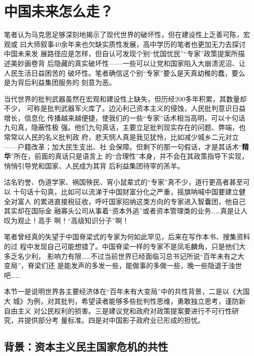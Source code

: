 \chapter{中国未来怎么走？}


笔者认为马克思足够深刻地揭示了现代世界的破坏性，但在建设性上乏善可陈，宏观或
曰大师叙事40余年来也欠缺实质性发展，高中学历的笔者也更加无力去探讨中国未来发
展路径应是怎样，但自认可发现个别“忧国忧民”“专家”政策提案所描述美妙画卷背
后隐藏的真实破坏性——一些可以让党和国家陷入大崩溃泥沼、让人民生活日益困苦的
破坏性。笔者确信这个别“专家”要么是天真幼稚的蠢，要么是为背后利益集团服务的
刻意为恶。

当代世界的批判武器虽然在宏观和建设性上缺失，但历经200多年积累，其数量却不少，
可称是批判武器军火库了。边沁利己资本主义的侵蚀，人民批判意识日益增长，信息化
传播越来越便捷，使我们的一些“专家”话术相当高明，可以十句话九句真，隐蔽性极
强。他们九句真话，主要立足批判现实存在的问题、弊端，也常常以人民的名义批判政
府，悲天悯人真是我见犹怜，比如减少城乡二元对立——户籍改革；加大民生支出、社
会保障。但剩下的那一句假话，才是其话术“\textbf{精华}”所在，前面的真话只是语言上
的“合理性”本身，并不会在其政策指导下实现，悄悄引导党和国家、人民成为其背
后利益集团待宰的羔羊。

沽名钓誉、伪道学家、祸国殃民、宵小鼠辈式的“专家”真不少，道行更高者甚至可以
十句话十句真，比如可以流涕于中国财富分化之严重，摇旗呐喊中国要建立健全对富人
的累进直接税征收，呼吁国家招纳这类方向的专家进入智囊团，他自己其实却在国际金
融寡头公司从事着“资本外逃”或者资本管理类的业务……真是让人叹为观止！高手
啊！“高级知识分子”啊！

笔者曾经真的失望于中国脊梁式的专家为何如此罕见，后来在写作本书、搜集资料的过
程中发现自己可能想错了。中国脊梁一样的专家不是凤毛麟角，只是他们大多乏名少利，
影响力有限……不过当前世界已经面临习总书记所说“百年未有之大变局”，脊梁们还
是能发声的多发一些，能做事的多做一些，晚一些隐退于浊世吧……

本节一是说明世界各主要经济体在“百年未有大变局”中的共性背景，二是以《大国大
城》为例，对其批判，希望读者能够多些批判性思维，勇敢独立思考，谨防新自由主义
对公民权利的损害。三是建议党和政府对政策提案要进行不可行性研究，并提供部分考
量标准。四是对中国影子政府业已形成的担忧。


\section{背景：资本主义民主国家危机的共性}


